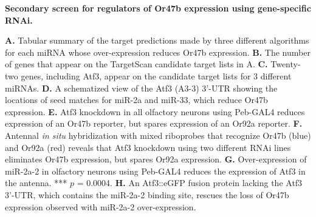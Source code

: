 {\bf Secondary screen for regulators of Or47b expression using gene-specific RNAi.}

\textbf{A.} Tabular summary of the target predictions made by three different algorithms for each miRNA whose over-expression reduces Or47b expression.
\textbf{B.} The number of genes that appear on the TargetScan candidate target lists in A.
\textbf{C.} Twenty-two genes, including Atf3, appear on the candidate target lists for 3 different miRNAs.
\textbf{D.} A schematized view of the Atf3 (A3-3) 3'-UTR showing the locations of seed matches for miR-2a and miR-33, which reduce Or47b expression.
\textbf{E.} Atf3 knockdown in all olfactory neurons using Peb-GAL4 reduces expression of an Or47b reporter, but spares expression of an Or92a reporter.
\textbf{F.} Antennal \emph{in situ} hybridization with mixed riboprobes that recognize Or47b (blue) and Or92a (red) reveals that Atf3 knockdown using two different RNAi lines eliminates Or47b expression, but spares Or92a expression.
\textbf{G.} Over-expression of miR-2a-2 in olfactory neurons using Peb-GAL4 reduces the expression of Atf3 in the antenna. *** $p$ = 0.0004.
\textbf{H.} An Atf3::eGFP fusion protein lacking the Atf3 3'-UTR, which contains the miR-2a-2 binding site, rescues the loss of Or47b expression observed with miR-2a-2 over-expression.
\label{fig:2}